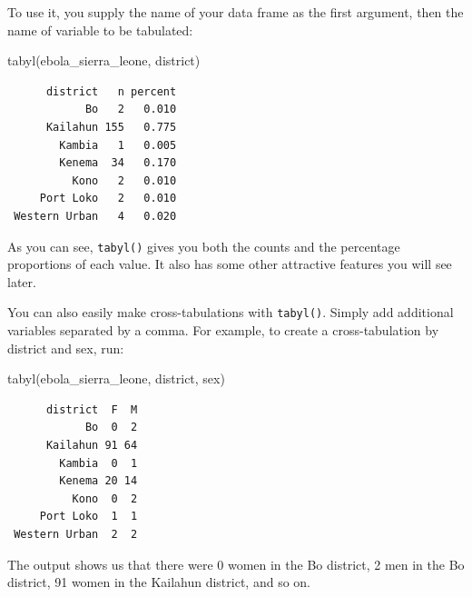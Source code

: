 \documentclass[
  letterpaper,
  DIV=11,
  numbers=noendperiod]{scrreprt}
\newenvironment{Shaded}{\begin{snugshade}}{\end{snugshade}}
\newcommand{\FunctionTok}[1]{\textcolor[rgb]{0.28,0.35,0.67}{#1}}
\newcommand{\NormalTok}[1]{\textcolor[rgb]{0.00,0.23,0.31}{#1}}
\begin{document}
To use it, you supply the name of your data frame as the first argument,
then the name of variable to be tabulated:

\begin{Shaded}
\begin{Highlighting}[]
\FunctionTok{tabyl}\NormalTok{(ebola\_sierra\_leone, district)}
\end{Highlighting}
\end{Shaded}

\begin{verbatim}
      district   n percent
            Bo   2   0.010
      Kailahun 155   0.775
        Kambia   1   0.005
        Kenema  34   0.170
          Kono   2   0.010
     Port Loko   2   0.010
 Western Urban   4   0.020
\end{verbatim}

As you can see, \texttt{tabyl()} gives you both the counts and the
percentage proportions of each value. It also has some other attractive
features you will see later.

\begin{tcolorbox}[enhanced jigsaw, title=\textcolor{quarto-callout-note-color}{\faInfo}\hspace{0.5em}{Pro Tip}, colbacktitle=quarto-callout-note-color!10!white, leftrule=.75mm, arc=.35mm, opacityback=0, bottomrule=.15mm, rightrule=.15mm, toptitle=1mm, breakable, toprule=.15mm, colback=white, coltitle=black, colframe=quarto-callout-note-color-frame, bottomtitle=1mm, titlerule=0mm, left=2mm, opacitybacktitle=0.6]

You can also easily make cross-tabulations with \texttt{tabyl()}. Simply
add additional variables separated by a comma. For example, to create a
cross-tabulation by district and sex, run:

\begin{Shaded}
\begin{Highlighting}[]
\FunctionTok{tabyl}\NormalTok{(ebola\_sierra\_leone, district, sex)}
\end{Highlighting}
\end{Shaded}

\begin{verbatim}
      district  F  M
            Bo  0  2
      Kailahun 91 64
        Kambia  0  1
        Kenema 20 14
          Kono  0  2
     Port Loko  1  1
 Western Urban  2  2
\end{verbatim}

The output shows us that there were 0 women in the Bo district, 2 men in
the Bo district, 91 women in the Kailahun district, and so on.

\end{tcolorbox}
\end{document}

